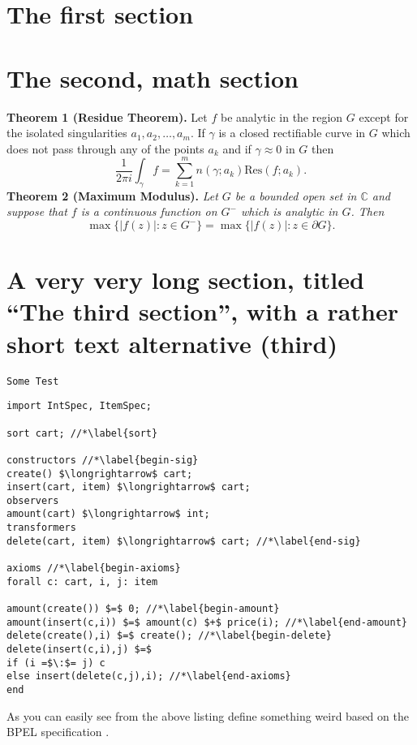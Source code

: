 \documentclass[mscthesis]{usiinfthesis}
\begin{document}
\lipsum[1-2]

\section{The first section}
\lipsum[3-4]

 \section{The second, math section}

\textbf{Theorem 1 (Residue Theorem).}
Let $f$ be analytic in the region $G$ except for the isolated singularities $a_1,a_2,\ldots,a_m$. If $\gamma$ is a closed rectifiable curve in $G$ which does not pass through any of the points $a_k$ and if $\gamma\approx 0$ in $G$ then
\[
\frac{1}{2\pi i}\int_\gamma f = \sum_{k=1}^m n(\gamma;a_k) \text{Res}(f;a_k).
\]
\textbf{Theorem 2 (Maximum Modulus).}
\emph{Let $G$ be a bounded open set in $\mathbb{C}$ and suppose that $f$ is a continuous function on $G^-$ which is analytic in $G$. Then}
\[
\max\{|f(z)|:z\in G^-\}=\max \{|f(z)|:z\in \partial G \}.
\]

\section[third]{A very very long section, titled ``The third section'', with
  a rather  short text alternative (third)}
\lipsum \texttt{Some Test}
\begin{lstlisting}
import IntSpec, ItemSpec;

sort cart; //*\label{sort}

constructors //*\label{begin-sig}
create() $\longrightarrow$ cart;
insert(cart, item) $\longrightarrow$ cart;
observers
amount(cart) $\longrightarrow$ int;
transformers
delete(cart, item) $\longrightarrow$ cart; //*\label{end-sig}

axioms //*\label{begin-axioms}
forall c: cart, i, j: item 

amount(create()) $=$ 0; //*\label{begin-amount}
amount(insert(c,i)) $=$ amount(c) $+$ price(i); //*\label{end-amount}
delete(create(),i) $=$ create(); //*\label{begin-delete}
delete(insert(c,i),j) $=$
if (i =$\:$= j) c
else insert(delete(c,j),i); //*\label{end-axioms}
end
\end{lstlisting}

As you can easily see from the above listing \citet{bbggs:iet07}
define something weird based on the BPEL specification
\citep{bpelspec}.
\nocite{*}
\end{document}
